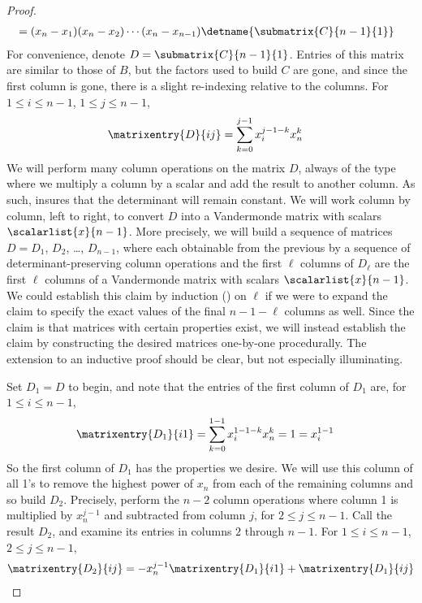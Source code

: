 \begin{proof}
\begin{align*}
%
&=(x_n-x_1)(x_n-x_2)\cdots(x_n-x_{n-1})\detname{\submatrix{C}{n-1}{1}}
%
\end{align*}
%
For convenience, denote $D=\submatrix{C}{n-1}{1}$.  Entries of this matrix are similar to those of $B$, but the factors used to build $C$ are gone, and since the first column is gone, there is a slight re-indexing relative to the columns.  For $1\leq i\leq n-1$, $1\leq j\leq n-1$,
%
\begin{align*}
\matrixentry{D}{ij}
&=\sum_{k=0}^{j-1} x_{i}^{j-1-k}x_{n}^{k}
\end{align*}
%
We will perform many column operations on the matrix $D$, always of the type where we multiply a column by a scalar and add the result to another column.  As such,  insures that the determinant will remain constant.  We will work column by column, left to right, to convert $D$ into a Vandermonde matrix with scalars $\scalarlist{x}{n-1}$.  More precisely, we will build a sequence of matrices $D=D_1$, $D_2$, \dots, $D_{n-1}$, where each obtainable from the previous by a sequence of determinant-preserving column operations and the first $\ell$ columns of $D_\ell$ are the first $\ell$ columns of a Vandermonde matrix with scalars $\scalarlist{x}{n-1}$.  We could establish this claim by induction () on $\ell$ if we were to expand the claim to specify the exact values of the final $n-1-\ell$ columns as well.  Since the claim is that matrices with certain properties exist, we will instead establish the claim by constructing the desired matrices one-by-one procedurally.  The extension to an inductive proof should be clear, but not especially illuminating.\par
%
Set $D_1=D$ to begin, and note that the entries of the first column of $D_1$ are, for $1\leq i\leq n-1$,
%
\begin{align*}
\matrixentry{D_1}{i1}
&=\sum_{k=0}^{1-1} x_{i}^{1-1-k}x_{n}^{k}
=1=x_{i}^{1-1}
\end{align*}
%
So the first column of $D_1$ has the properties we desire.  We will use this column of all 1's to remove the highest power of $x_n$ from each of the remaining columns and so build $D_2$.  Precisely, perform the $n-2$ column operations where column 1 is multiplied by $x_n^{j-1}$ and subtracted from column $j$, for $2\leq j\leq n-1$.  Call the result $D_2$, and examine its entries in columns $2$ through $n-1$.  For $1\leq i\leq n-1$, $2\leq j\leq n-1$,
%
\begin{align*}
\matrixentry{D_2}{ij}
&=-x_n^{j-1}\matrixentry{D_1}{i1}+\matrixentry{D_1}{ij}\\

\end{align*}
\end{proof}
